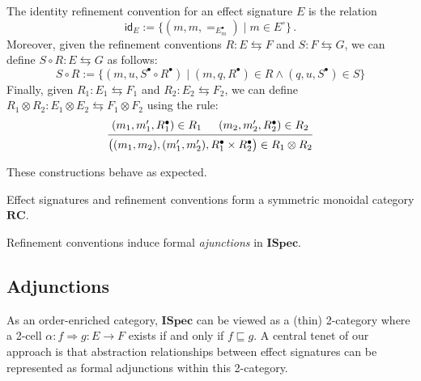 \documentclass[sigplan,10pt,review,anonymous]{acmart}
\newcommand{\kw}[1]{\ensuremath{ \mathsf{#1} }}
\newcommand{\que}{{\circ}}
\newcommand{\ans}{{\bullet}}
\newcommand{\ISpec}{\mathbf{ISpec}}
\begin{document}
\begin{definition} \label{def:rccomp}
The identity refinement convention
for an effect signature $E$
is the relation
\[
  \kw{id}_E := \{(m, m, {=}_{E^\ans_m}) \mid m \in E^\que\} \,.
\]
Moreover,
given the refinement conventions
$R : E \leftrightarrows F$
and
$S : F \leftrightarrows G$,
we can define
$S \circ R : E \leftrightarrows G$ as follows:
\[
  S \circ R :=
    \{ (m, u, S^\ans \circ R^\ans) \mid
       (m, q, R^\ans) \in R \wedge
       (q, u, S^\ans) \in S \}
\]
Finally, given
$R_1 : E_1 \leftrightarrows F_1$ and
$R_2 : E_2 \leftrightarrows F_2$,
we can define
$R_1 \otimes R_2 : E_1 \otimes E_2 \leftrightarrows F_1 \otimes F_2$
using the rule:
\[
  \begin{prooftree}
    \hypo{(m_1, m_1', R_1^\ans) \in R_1}
    \hypo{(m_2, m_2', R_2^\ans) \in R_2}
    \infer2{
      \big( (m_1, m_2), (m_1', m_2'), R_1^\ans \times R_2^\ans \big)
      \in R_1 \otimes R_2}
  \end{prooftree}
\]
\end{definition}

\noindent
These constructions behave as expected.

\begin{theorem}
Effect signatures and refinement conventions
form a symmetric monoidal category $\mathbf{RC}$.
\end{theorem}

\noindent
Refinement conventions induce formal \emph{ajunctions} in $\ISpec$.


\subsection{Adjunctions} %

As an order-enriched category,
$\ISpec$ can be viewed as a (thin) 2-category
where
a 2-cell $\alpha : f \Rightarrow g : E \rightarrow F$ exists
if and only if $f \sqsubseteq g$.
A central tenet of our approach
is that abstraction relationships
between effect signatures
can be represented as formal adjunctions
within this 2-category.
\end{document}
